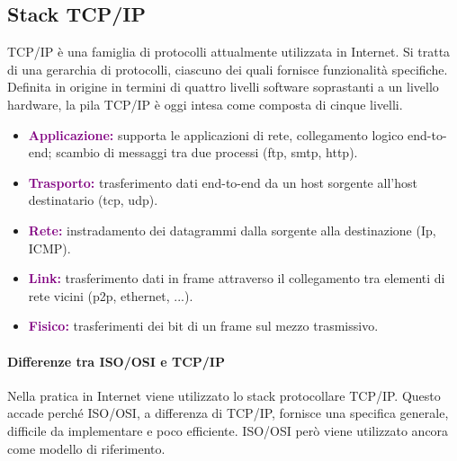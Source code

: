 \subsection{Stack TCP/IP}
TCP/IP è una famiglia di protocolli attualmente utilizzata in Internet. Si tratta di una gerarchia di protocolli, ciascuno dei quali fornisce funzionalità specifiche.
\newline Definita in origine in termini di quattro livelli software soprastanti a un livello hardware, la pila TCP/IP è oggi intesa come composta di cinque livelli.
\begin{itemize}
    \item \textbf{\textcolor{purple}{Applicazione:}} supporta le applicazioni di rete, collegamento logico end-to-end; scambio di messaggi tra due processi (ftp, smtp, http).
    \item \textbf{\textcolor{purple}{Trasporto:}} trasferimento dati end-to-end da un host sorgente all’host destinatario (tcp, udp).
    \item \textbf{\textcolor{purple}{Rete:}} instradamento dei datagrammi dalla sorgente alla destinazione (Ip, ICMP).
    \item \textbf{\textcolor{purple}{Link:}} trasferimento dati in frame attraverso il collegamento tra elementi di rete vicini (p2p, ethernet, ...).
    \item \textbf{\textcolor{purple}{Fisico:}} trasferimenti dei bit di un frame sul mezzo trasmissivo.
\end{itemize}

\paragraph{Differenze tra ISO/OSI e TCP/IP} Nella pratica in Internet viene utilizzato lo stack protocollare TCP/IP. Questo accade perché ISO/OSI, a differenza di TCP/IP, fornisce una specifica generale, difficile da implementare e poco efficiente. ISO/OSI però viene utilizzato ancora come modello di riferimento.